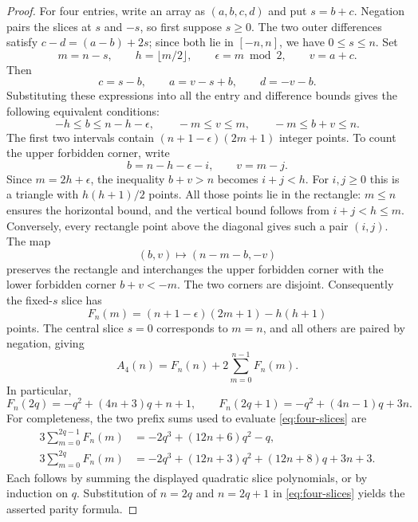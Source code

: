 \begin{proof}
For four entries, write an array as $(a,b,c,d)$ and put $s=b+c$.
Negation pairs the slices at $s$ and $-s$, so first suppose $s\ge0$.
The two outer differences satisfy
$c-d=(a-b)+2s$; since both lie in $[-n,n]$, we have $0\le s\le n$.
Set
\[
 m=n-s,\qquad h=\lfloor m/2\rfloor,\qquad
 \epsilon=m\bmod2,\qquad v=a+c.
\]
Then
\[
 c=s-b,\qquad a=v-s+b,\qquad d=-v-b.
\]
Substituting these expressions into all the entry and difference
bounds gives the following equivalent conditions:
\begin{equation}\label{eq:four-rectangle}
 -h\le b\le n-h-\epsilon,\qquad
 -m\le v\le m,\qquad -m\le b+v\le n.
\end{equation}
The first two intervals contain
$(n+1-\epsilon)(2m+1)$ integer points. To count the upper forbidden
corner, write
\[
 b=n-h-\epsilon-i,\qquad v=m-j.
\]
Since $m=2h+\epsilon$, the inequality $b+v>n$ becomes $i+j<h$.
For $i,j\ge0$ this is a triangle with $h(h+1)/2$ points. All those
points lie in the rectangle: $m\le n$ ensures the horizontal bound,
and the vertical bound follows from $i+j<h\le m$. Conversely,
every rectangle point above the diagonal gives such a pair $(i,j)$.
The map
\[
 (b,v)\longmapsto(n-m-b,-v)
\]
preserves the rectangle and interchanges the upper forbidden corner
with the lower forbidden corner $b+v<-m$. The two corners are disjoint.
Consequently the fixed-$s$ slice has
\begin{equation}\label{eq:four-slice-polynomial}
 F_n(m)=(n+1-\epsilon)(2m+1)-h(h+1)
\end{equation}
points. The central slice $s=0$ corresponds to $m=n$, and all others
are paired by negation, giving
\begin{equation}\label{eq:four-slices}
 A_4(n)=F_n(n)+2\sum_{m=0}^{n-1}F_n(m).
\end{equation}
In particular,
\[
 F_n(2q)=-q^2+(4n+3)q+n+1,\qquad
 F_n(2q+1)=-q^2+(4n-1)q+3n.
\]
For completeness, the two prefix sums used to evaluate
\eqref{eq:four-slices} are
\begin{align*}
 3\sum_{m=0}^{2q-1}F_n(m)
   &=-2q^3+(12n+6)q^2-q,\\
 3\sum_{m=0}^{2q}F_n(m)
   &=-2q^3+(12n+3)q^2+(12n+8)q+3n+3.
\end{align*}
Each follows by summing the displayed quadratic slice polynomials,
or by induction on $q$. Substitution of $n=2q$ and $n=2q+1$ in
\eqref{eq:four-slices} yields the asserted parity formula.
\end{proof}

